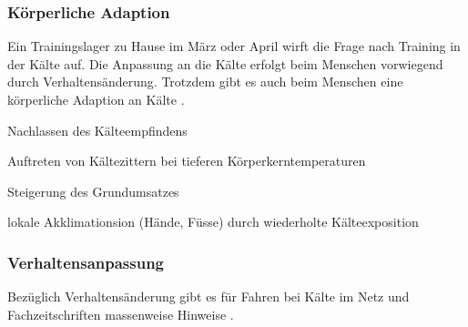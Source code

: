 \documentclass[a4paper,DIV13,BCOR0cm]{scrartcl}
\newcommand{\Tlzh}{Trainingslager zu Hause}
\begin{document}
\subsubsection{Körperliche Adaption}
Ein \Tlzh{} im März oder April wirft die Frage nach Training in der Kälte auf.
Die Anpassung an die Kälte erfolgt beim Menschen vorwiegend durch Verhaltensänderung.
Trotzdem gibt es auch beim Menschen eine körperliche Adaption an Kälte \cite[S. 1032]{Weineck2010}.

\begin{itemize*}
        \item Nachlassen des Kälteempfindens
        \item Auftreten von Kältezittern bei tieferen Körperkerntemperaturen
        \item Steigerung des Grundumsatzes
        \item lokale Akklimationsion (Hände, Füsse) durch wiederholte Kälteexposition
\end{itemize*}

\subsubsection{Verhaltensanpassung}

Bezüglich Verhaltensänderung gibt es für Fahren bei Kälte im Netz und Fachzeitschriften massenweise Hinweise
\cite{Thomas2009rennradbuch, gcn2011winter,gcn2015winter, gcn2015wintermistakes,beck2015frostschutz}.
\end{document}
